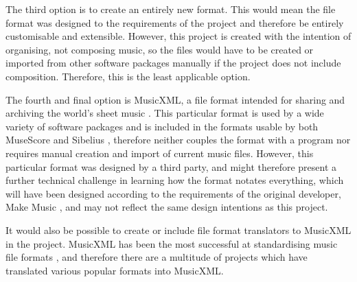 The third option is to create an entirely new format. This would mean the file format was designed to the requirements of the project and therefore be entirely customisable and extensible. However, this project is created with the intention of organising, not composing music, so the files would have to be created or imported from other software packages manually if the project does not include composition. Therefore, this is the least applicable option.

The fourth and final option is MusicXML, a file format intended for sharing and archiving the world's sheet music \parencite{mxml}. This particular format is used by a wide variety of software packages \parencite{mxml} and is included in the formats usable by both MuseScore \parencite{MuseTour} and Sibelius \parencite{avid}, therefore neither couples the format with a program nor requires manual creation and import of current music files. However, this particular format was designed by a third party, and might therefore present a further technical challenge in learning how the format notates everything, which will have been designed according to the requirements of the original developer, Make Music \parencite{mxml}, and may not reflect the same design intentions as this project.

It would also be possible to create or include file format translators to MusicXML in the project. MusicXML has been the most successful at standardising music file formats \parencite{mxmlSoft}, and therefore there are a multitude of projects which have translated various popular formats into MusicXML.

